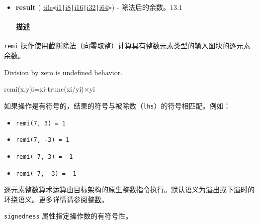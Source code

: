 \documentclass{article}
\begin{document}
\begin{itemize}
\item \textbf{result} ( \href{https://docs.nvidia.com/cuda/tile-ir/latest/sections/types.html#type-tile}{tile}\texttt{<}\href{https://docs.nvidia.com/cuda/tile-ir/latest/sections/types.html#subsection-element-types}{i1}\texttt{|}\href{https://docs.nvidia.com/cuda/tile-ir/latest/sections/types.html#subsection-element-types}{i8}\texttt{|}\href{https://docs.nvidia.com/cuda/tile-ir/latest/sections/types.html#subsection-element-types}{i16}\texttt{|}\href{https://docs.nvidia.com/cuda/tile-ir/latest/sections/types.html#subsection-element-types}{i32}\texttt{|}\href{https://docs.nvidia.com/cuda/tile-ir/latest/sections/types.html#subsection-element-types}{i64}\texttt{>}) - 除法后的余数。$\boxed{13.1}$




\paragraph{描述}


\end{itemize}
\texttt{remi} 操作使用截断除法（向零取整）计算具有整数元素类型的输入图块的逐元素余数。

Division by zero is undefined behavior.




remi(x,y)i=xi-trunc(xi/yi)×yi


如果操作是有符号的，结果的符号与被除数（\texttt{lhs}）的符号相匹配。例如：



\begin{itemize}
\item \texttt{remi(7, 3) = 1}

\item \texttt{remi(7, -3) = 1}

\item \texttt{remi(-7, 3) = -1}

\item \texttt{remi(-7, -3) = -1}



\end{itemize}
逐元素整数算术运算由目标架构的原生整数指令执行。默认语义为溢出或下溢时的环绕语义。更多详情请参阅\href{https://docs.nvidia.com/cuda/tile-ir/latest/sections/operations.html#op-group-integer}{整数}。



\texttt{signedness} 属性指定操作数的有符号性。
\end{document}
